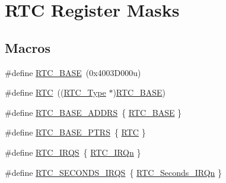 \hypertarget{group___r_t_c___register___masks}{}\section{R\+TC Register Masks}
\label{group___r_t_c___register___masks}
\subsection*{Macros}
\begin{DoxyCompactItemize}
\item 
\#define \mbox{\hyperlink{group___r_t_c___register___masks_ga4265e665d56225412e57a61d87417022}{R\+T\+C\+\_\+\+B\+A\+SE}}~(0x4003\+D000u)
\item 
\#define \mbox{\hyperlink{group___r_t_c___register___masks_ga5359a088f5d8b20ce74d920e46059304}{R\+TC}}~((\mbox{\hyperlink{struct_r_t_c___type}{R\+T\+C\+\_\+\+Type}} $\ast$)\mbox{\hyperlink{group___r_t_c___register___masks_ga4265e665d56225412e57a61d87417022}{R\+T\+C\+\_\+\+B\+A\+SE}})
\item 
\#define \mbox{\hyperlink{group___r_t_c___register___masks_ga417e8fb70b5f6eef161b10f664daa363}{R\+T\+C\+\_\+\+B\+A\+S\+E\+\_\+\+A\+D\+D\+RS}}~\{ \mbox{\hyperlink{group___r_t_c___register___masks_ga4265e665d56225412e57a61d87417022}{R\+T\+C\+\_\+\+B\+A\+SE}} \}
\item 
\#define \mbox{\hyperlink{group___r_t_c___register___masks_ga426dff8af34f3304d58b5bed5a54e583}{R\+T\+C\+\_\+\+B\+A\+S\+E\+\_\+\+P\+T\+RS}}~\{ \mbox{\hyperlink{group___r_t_c___register___masks_ga5359a088f5d8b20ce74d920e46059304}{R\+TC}} \}
\item 
\#define \mbox{\hyperlink{group___r_t_c___register___masks_gaa24243a5e7ef8be5eeeedde3eaaa366e}{R\+T\+C\+\_\+\+I\+R\+QS}}~\{ \mbox{\hyperlink{group___interrupt__vector__numbers_gga666eb0caeb12ec0e281415592ae89083adcc0f2770f7f57f75fac3d8bcac0e858}{R\+T\+C\+\_\+\+I\+R\+Qn}} \}
\item 
\#define \mbox{\hyperlink{group___r_t_c___register___masks_ga9d5d6f8bbcb56fa1073bebb9d130faad}{R\+T\+C\+\_\+\+S\+E\+C\+O\+N\+D\+S\+\_\+\+I\+R\+QS}}~\{ \mbox{\hyperlink{group___interrupt__vector__numbers_gga666eb0caeb12ec0e281415592ae89083a2212c7b8ea636a7df0c31f21556e4fae}{R\+T\+C\+\_\+\+Seconds\+\_\+\+I\+R\+Qn}} \}
\end{DoxyCompactItemize}
